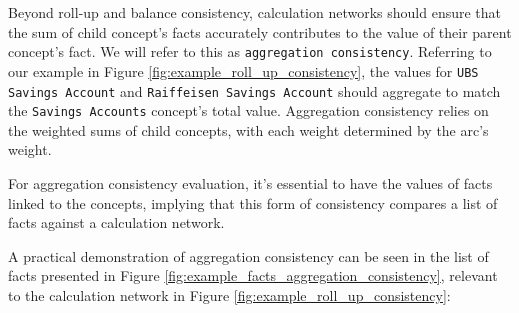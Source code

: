 Beyond roll-up and balance consistency, calculation networks should ensure that the sum of child concept's facts accurately contributes to the value of their parent concept's fact.
We will refer to this as \texttt{aggregation consistency}.
Referring to our example in Figure \ref{fig:example_roll_up_consistency},  
the values for \texttt{UBS Savings Account} and \texttt{Raiffeisen Savings Account} should aggregate to match the \texttt{Savings Accounts} concept's total value.  
Aggregation consistency relies on the weighted sums of child concepts, with each weight determined by the arc's weight.

For aggregation consistency evaluation, it's essential to have the values of facts linked to the concepts,  
implying that this form of consistency compares a list of facts against a calculation network.

A practical demonstration of aggregation consistency can be seen in the list of facts presented in Figure \ref{fig:example_facts_aggregation_consistency}, 
relevant to the calculation network in Figure \ref{fig:example_roll_up_consistency}:


